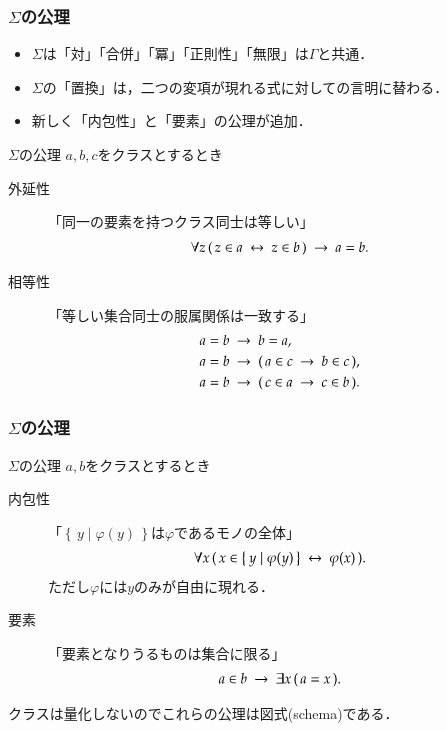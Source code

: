 \documentclass[dvipdfmx,10pt,notheorems]{beamer}
\theoremstyle{definition}
\newcommand{\Set}[2]{\left\{\, #1 \mid #2\, \right\}} %
\newcommand{\rarrow}{\hspace{0.25em}\rightarrow\hspace{0.25em}} %
\newcommand{\lrarrow}{\hspace{0.25em}\leftrightarrow\hspace{0.25em}} %
\begin{document}
\begin{frame}\frametitle{$\Sigma$の公理}
	\begin{itemize}
		\item $\Sigma$は「対」「合併」「冪」「正則性」「無限」は$\Gamma$と共通．
		\item $\Sigma$の「置換」は，二つの変項が現れる式に対しての言明に替わる．
		\item 新しく「内包性」と「要素」の公理が追加．
	\end{itemize}
	
	\begin{alertblock}{$\Sigma$の公理}
		$a,b,c$をクラスとするとき
		\begin{description}
			\item[外延性] 「同一の要素を持つクラス同士は等しい」
				\begin{align}
					\forall z\, (\, z \in a \lrarrow z \in b\, ) \rarrow a = b.
				\end{align}
			\item[相等性] 「等しい集合同士の服属関係は一致する」
				\begin{align}
					&a = b \rarrow b = a, \\
					&a = b \rarrow (\, a \in c \rarrow b \in c\, ), \\
					&a = b \rarrow (\, c \in a \rarrow c \in b\, ).
				\end{align}
		\end{description}	
	\end{alertblock}
\end{frame}

\begin{frame}\frametitle{$\Sigma$の公理}
	
	\begin{alertblock}{$\Sigma$の公理}
		$a,b$をクラスとするとき
		\begin{description}
			\item[内包性] 「$\Set{y}{\varphi(y)}$は$\varphi$であるモノの全体」
				\begin{align}
					\forall x\, (\, x \in \Set{y}{\varphi(y)} \lrarrow \varphi(x)\, ).
				\end{align}
				ただし$\varphi$には$y$のみが自由に現れる．
				
			\item[要素] 「要素となりうるものは集合に限る」
				\begin{align}
					a \in b \rarrow \exists x\, (\, a = x\, ).
				\end{align}
		\end{description}	
	\end{alertblock}	
	クラスは量化しないのでこれらの公理は図式(schema)である．	
\end{frame}
\end{document}
